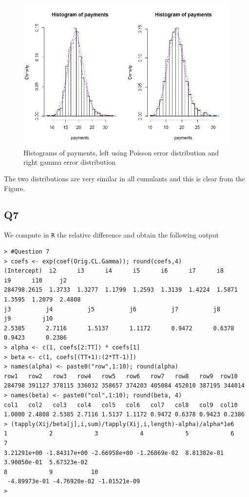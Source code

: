 \documentclass[11pt]{article}
\begin{document}
\begin{center}
	\begin{figure}[H]
		
		\includegraphics[scale=0.75]{Question6_NL5.png}
		
		\caption{Histograms of payments, left using Poisson error distribution and right gamma error distribution}
		\label{Figure_Question6}
		
	\end{figure}
\end{center}

The two distributions are very similar in all cumulants and this is clear from the Figure.


\subsection*{Q7}
We compute in \verb|R| the relative difference and obtain the following output 
\begin{verbatim}
> #Question 7
> coefs <- exp(coef(Orig.CL.Gamma)); round(coefs,4)
(Intercept)  i2      i3      i4      i5      i6      i7      i8      i9      i10     j2 
284798.2615  1.3733  1.3277  1.1799  1.2593  1.3139  1.4224  1.5871  1.3595  1.2079  2.4808 
j3          j4          j5          j6          j7          j8          j9         j10 
2.5385      2.7116      1.5137      1.1172      0.9472      0.6378      0.9423      0.2386 
> alpha <- c(1, coefs[2:TT]) * coefs[1]
> beta <- c(1, coefs[(TT+1):(2*TT-1)])
> names(alpha) <- paste0("row",1:10); round(alpha)
row1   row2   row3   row4   row5   row6   row7   row8   row9  row10 
284798 391127 378115 336032 358657 374203 405084 452010 387195 344014 
> names(beta) <- paste0("col",1:10); round(beta, 4)
col1   col2   col3   col4   col5   col6   col7   col8   col9  col10 
1.0000 2.4808 2.5385 2.7116 1.5137 1.1172 0.9472 0.6378 0.9423 0.2386 
> (tapply(Xij/beta[j],i,sum)/tapply(Xij,i,length)-alpha)/alpha*1e6
1            2            3            4            5            6            7            
3.21291e+00 -1.84317e+00 -2.66958e+00 -1.26869e-02  8.81382e-01  3.90050e-01  5.67323e-02
8            9           10 
 -4.89973e-01 -4.76920e-02 -1.01521e-09 
>
\end{verbatim}
\end{document}
